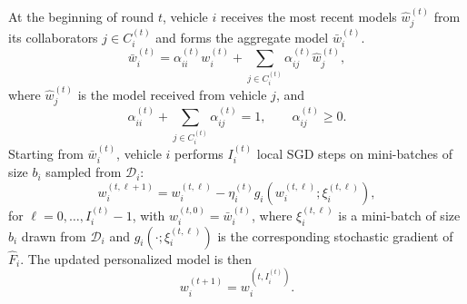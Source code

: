 At the beginning of round $t$, vehicle $i$ receives the most recent models $\hat{w}_j^{(t)}$ from its collaborators $j\in C_i^{(t)}$ and forms the aggregate model $\bar{w}_i^{(t)}$.
%
\begin{equation}
    \bar{w}_i^{(t)} = \alpha_{ii}^{(t)} w_i^{(t)} + \sum_{j\in C_i^{(t)}} \alpha_{ij}^{(t)} \hat{w}_j^{(t)},
\end{equation}
%
where $\hat{w}_j^{(t)}$ is the model received from vehicle $j$, and
%
\begin{equation*}
    \alpha_{ii}^{(t)}+\sum_{j\in C_i^{(t)}}\alpha_{ij}^{(t)}=1,
    \qquad
    \alpha_{ij}^{(t)}\geq 0.
\end{equation*}
%
Starting from $\bar{w}_i^{(t)}$, vehicle $i$ performs $I_i^{(t)}$ local SGD steps on mini-batches of size $b_i$ sampled from $\mathcal{D}_i$:
%
\begin{equation}
    w_i^{(t,\ell+1)} = w_i^{(t,\ell)} - \eta_i^{(t)} g_i\!\left(w_i^{(t,\ell)};\xi_i^{(t,\ell)}\right),
\end{equation}
%
for $\ell=0,\dots,I_i^{(t)}-1$, with $w_i^{(t,0)}=\bar{w}_i^{(t)}$, where $\xi_i^{(t,\ell)}$ is a mini-batch of size $b_i$ drawn from $\mathcal{D}_i$ and $g_i(\cdot;\xi_i^{(t,\ell)})$ is the corresponding stochastic gradient of $\hat{F}_i$. The updated personalized model is then
%
\begin{equation*}
    w_i^{(t+1)} = w_i^{(t,I_i^{(t)})}.
\end{equation*}



